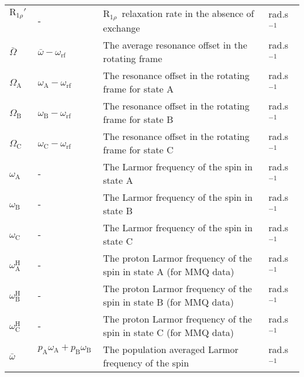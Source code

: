 \documentclass[a4paper,11pt,twoside,openright]{book}
\begin{document}
{\begin{landscape}
\begin{center}
\begin{small}
\begin{longtable}{llll}
$\mathrm{R}_{1\rho}'$\     & -                              & $\mathrm{R}_{1\rho}$\  relaxation rate in the absence of exchange                         & rad.s$^{-1}$\  \\
$\bar\Omega $\        & $\bar\omega - \omega_{\textrm{rf}}$\          & The average resonance offset in the rotating frame                            & rad.s$^{-1}$\  \\
$\Omega_{\textrm{A}}$\          & $\omega_{\textrm{A}}- \omega_{\textrm{rf}}$\            & The resonance offset in the rotating frame for state A                        & rad.s$^{-1}$\  \\
$\Omega_{\textrm{B}}$\          & $\omega_{\textrm{B}}- \omega_{\textrm{rf}}$\            & The resonance offset in the rotating frame for state B                        & rad.s$^{-1}$\  \\
$\Omega_{\textrm{C}}$\          & $\omega_{\textrm{C}}- \omega_{\textrm{rf}}$\            & The resonance offset in the rotating frame for state C                        & rad.s$^{-1}$\  \\
$\omega_{\textrm{A}}$\           & -                              & The Larmor frequency of the spin in state A                                   & rad.s$^{-1}$\  \\
$\omega_{\textrm{B}}$\           & -                              & The Larmor frequency of the spin in state B                                   & rad.s$^{-1}$\  \\
$\omega_{\textrm{C}}$\           & -                              & The Larmor frequency of the spin in state C                                   & rad.s$^{-1}$\  \\
$\omega^{\scriptscriptstyle\mathrm{H}}_{\textrm{A}}$\          & -                              & The proton Larmor frequency of the spin in state A (for MMQ data)             & rad.s$^{-1}$\  \\
$\omega^{\scriptscriptstyle\mathrm{H}}_{\textrm{B}}$\          & -                              & The proton Larmor frequency of the spin in state B (for MMQ data)             & rad.s$^{-1}$\  \\
$\omega^{\scriptscriptstyle\mathrm{H}}_{\textrm{C}}$\          & -                              & The proton Larmor frequency of the spin in state C (for MMQ data)             & rad.s$^{-1}$\  \\
$\bar\omega $\         & $p_{\textrm{A}}\omega_{\textrm{A}}+ p_{\textrm{B}}\omega_{\textrm{B}}$\       & The population averaged Larmor frequency of the spin                          & rad.s$^{-1}$\  \\

\end{longtable}
\end{small}
\end{center}
\end{landscape}}
\end{document}
